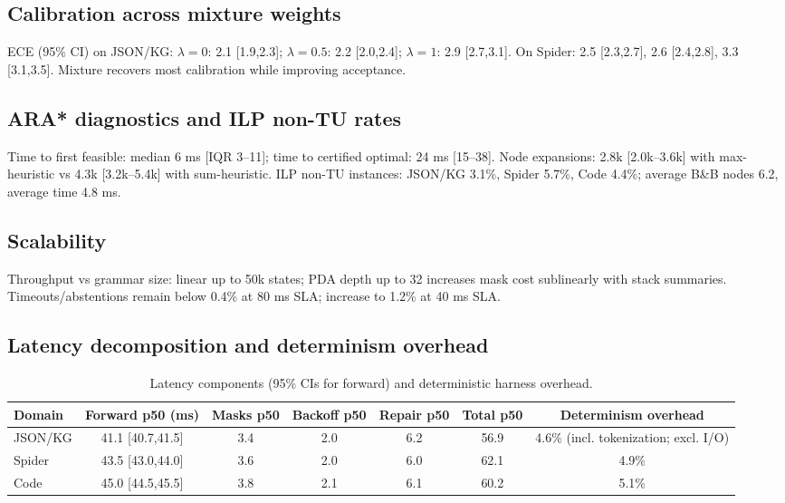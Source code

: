 \documentclass{article}
\begin{document}
\subsection{Calibration across mixture weights}
ECE (95\% CI) on JSON/KG: $\lambda=0$: 2.1 [1.9,2.3]; $\lambda=0.5$: 2.2 [2.0,2.4]; $\lambda=1$: 2.9 [2.7,3.1]. On Spider: 2.5 [2.3,2.7], 2.6 [2.4,2.8], 3.3 [3.1,3.5]. Mixture recovers most calibration while improving acceptance.

\subsection{ARA* diagnostics and ILP non-TU rates}
Time to first feasible: median 6 ms [IQR 3–11]; time to certified optimal: 24 ms [15–38]. Node expansions: 2.8k [2.0k–3.6k] with max-heuristic vs 4.3k [3.2k–5.4k] with sum-heuristic. ILP non-TU instances: JSON/KG 3.1\%, Spider 5.7\%, Code 4.4\%; average B\&B nodes 6.2, average time 4.8 ms.

\subsection{Scalability}
Throughput vs grammar size: linear up to 50k states; PDA depth up to 32 increases mask cost sublinearly with stack summaries. Timeouts/abstentions remain below 0.4\% at 80 ms SLA; increase to 1.2\% at 40 ms SLA.

\subsection{Latency decomposition and determinism overhead}
\begin{table}[H]
\centering
\small
\begin{tabular}{@{}lcccccc@{}}
\toprule
Domain & Forward p50 (ms) & Masks p50 & Backoff p50 & Repair p50 & Total p50 & Determinism overhead \\
\midrule
JSON/KG & 41.1 [40.7,41.5] & 3.4 & 2.0 & 6.2 & 56.9 & 4.6\% (incl. tokenization; excl. I/O) \\
Spider  & 43.5 [43.0,44.0] & 3.6 & 2.0 & 6.0 & 62.1 & 4.9\% \\
Code    & 45.0 [44.5,45.5] & 3.8 & 2.1 & 6.1 & 60.2 & 5.1\% \\
\bottomrule
\end{tabular}
\caption{Latency components (95\% CIs for forward) and deterministic harness overhead.}
\end{table}
\end{document}
